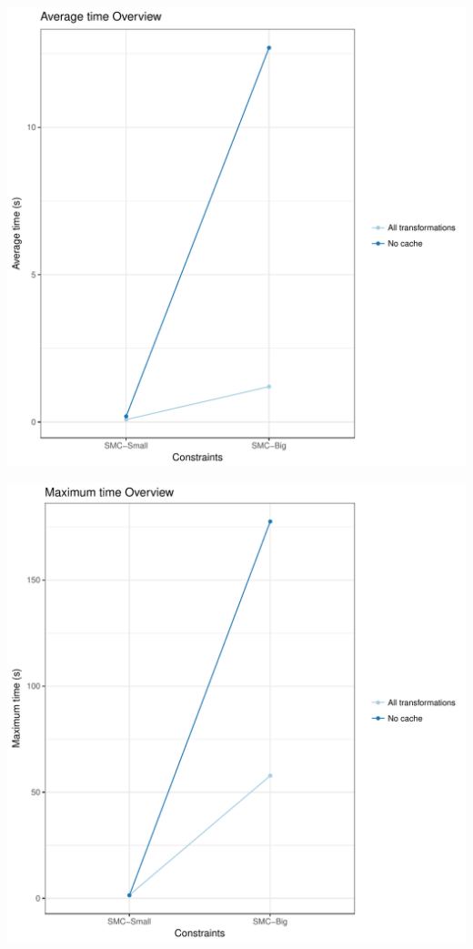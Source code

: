 \documentclass{article}\usepackage[]{graphicx}\usepackage[]{color}
\makeatletter
\def\maxwidth{ %
  \ifdim\Gin@nat@width>\linewidth
    \linewidth
  \else
    \Gin@nat@width
  \fi
}
\newenvironment{knitrout}{}{} %
\makeatother
\begin{document}
\begin{knitrout}
\color{fgcolor}
\includegraphics[width=\maxwidth]{figure/overview_averageTime-1} 

\end{knitrout}
\begin{knitrout}
\color{fgcolor}
\includegraphics[width=\maxwidth]{figure/overview_maxTime-1} 

\end{knitrout}
\end{document}

